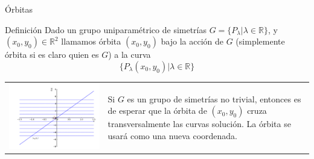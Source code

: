 \documentclass[handout,hyperref={colorlinks=true}]{beamer}
\newcommand{\rr}{\mathbb{R}}
\renewcommand{\emph}[1]{\textcolor[rgb]{1,0,0}{#1}}
\newcommand{\nl}{\onslide<+-> }
\begin{document}
\begin{frame}{Órbitas}

\nl\begin{block}{Definición}
Dado un grupo uniparamétrico de simetrías $G=\{P_{\lambda}|\lambda\in\rr\}$, y $(x_0,y_0)\in\rr^2$ llamamos \emph{órbita $(x_0,y_0)$ bajo la acción de  $G$} (simplemente órbita si es claro quien es $G$) a la curva
\[\{P_{\lambda}(x_0,y_0)|\lambda\in\rr\} \]
\end{block}

\nl 
\begin{tabular}{m{5cm} m{4cm}}
\includegraphics[scale=.3]{imagenes/sol_trivialB.png} &
Si $G$ es un grupo de simetrías no trivial, entonces es de esperar que la órbita de  $(x_0,y_0)$ cruza transversalmente las curvas solución. La órbita se usará como una nueva coordenada.   
\end{tabular}

\end{frame}
\end{document}
